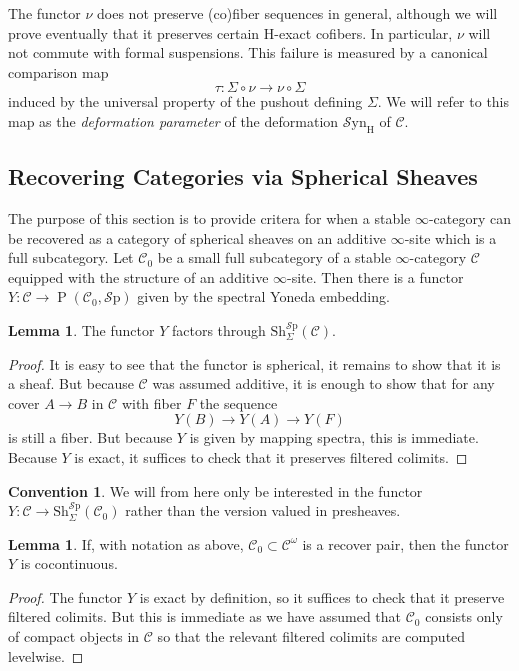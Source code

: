 \documentclass[10pt]{amsart}
\theoremstyle{definition}
\numberwithin{figure}{section}
\numberwithin{equation}{section}
\newtheorem{lemma}[figure]{Lemma}
\newtheorem{convention}[figure]{Convention}
\newcommand{\cC}{\mathcal{C}}
\theoremstyle{cited}
\newcommand{\Psh}{\operatorname{P}}
\newcommand{\Sp}{{\mathcal{S}\mathrm{p}}}
\newcommand{\Sh}{\mathrm{Sh}}
\newcommand{\Syn}{\mathcal{S}\mathrm{yn}}
\renewcommand{\H}{\mathrm{H}}
\begin{document}
The functor $\nu$ does not preserve (co)fiber sequences in general, although we will prove eventually that it preserves certain $\H$-exact cofibers. In particular, $\nu$ will not commute with formal suspensions. This failure is measured by a canonical comparison map
\[
\tau: \Sigma \circ \nu \to \nu \circ \Sigma
\]
induced by the universal property of the pushout defining $\Sigma$. We will refer to this map as the \textit{deformation parameter} of the deformation $\Syn_\H$ of $\cC$. 

\subsection{Recovering Categories via Spherical Sheaves}

The purpose of this section is to provide critera for when a stable $\infty$-category can be recovered as a category of spherical sheaves on an additive $\infty$-site which is a full subcategory. Let $\cC_0$ be a small full subcategory of a stable $\infty$-category $\cC$ equipped with the structure of an additive $\infty$-site. Then there is a functor $Y:\cC\to \Psh(\cC_0,\Sp)$ given by the spectral Yoneda embedding.

\begin{lemma}
  The functor $Y$ factors through $\Sh_\Sigma^\Sp(\cC)$.
\end{lemma}

\begin{proof}
  It is easy to see that the functor is spherical, it remains to show that it is a sheaf. But because $\cC$ was assumed additive, it is enough to show that for any cover $A\to B$ in $\cC$ with fiber $F$ the sequence
  \[
  Y(B)\to Y(A)\to Y(F)
  \]
  is still a fiber. But because $Y$ is given by mapping spectra, this is immediate. Because $Y$ is exact, it suffices to check that it preserves filtered colimits. 
\end{proof}

\begin{convention}
  We will from here only be interested in the functor $Y:\cC\to \Sh_\Sigma^\Sp(\cC_0)$ rather than the version valued in presheaves.
\end{convention}

\begin{lemma}
  If, with notation as above, $\cC_0\subset \cC^\omega$ is a recover pair, then the functor $Y$ is cocontinuous.
\end{lemma}

\begin{proof}
  The functor $Y$ is exact by definition, so it suffices to check that it preserve filtered colimits. But this is immediate as we have assumed that $\cC_0$ consists only of compact objects in $\cC$ so that the relevant filtered colimits are computed levelwise.
\end{proof}
\end{document}
